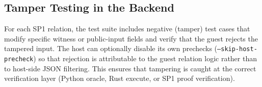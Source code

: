 \subsection{Tamper Testing in the Backend}

For each SP1 relation, the test suite includes negative (tamper) test cases
that modify specific witness or public-input fields and verify that the guest
rejects the tampered input. The host can optionally disable its own prechecks
(\texttt{--skip-host-precheck}) so that rejection is attributable to the guest
relation logic rather than to host-side JSON filtering. This ensures that
tampering is caught at the correct verification layer (Python oracle, Rust
execute, or SP1 proof verification).
